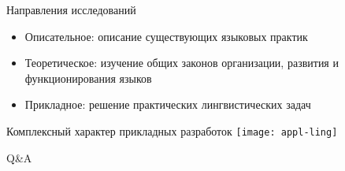 \begin{frame}{Направления исследований}
    \begin{itemize}
        \item Описательное: описание существующих языковых практик
        \item Теоретическое: изучение общих законов организации, развития и функционирования языков
        \item Прикладное: решение практических лингвистических задач
    \end{itemize}
\end{frame}

\begin{frame}{Комплексный характер прикладных разработок}
    \centering
    \texttt{[image: appl-ling]}
\end{frame}

\begin{frame}{}
    \centering

    \vfill
    Q\&A
    \vfill
\end{frame}
